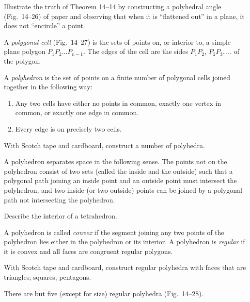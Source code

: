\documentclass[11pt]{book}
\theoremstyle{bkplain}
\theoremstyle{XIplainnote}
\theoremstyle{bkplain}
\theoremstyle{bkplain}
\begin{document}
Illustrate the truth of Theorem 14--14 by constructing a polyhedral angle
(Fig.~14--26) of paper and observing that when it is ``flattened out'' in a
plane, it does not ``encircle'' a point.

\FIGXIVTWENTYSIXTWENTYSEVEN

\begin{definition}
A \emph{polygonal cell} (Fig.~14--27) is the sets of points on, or interior to,
a simple plane polygon $P_1P_2\ldots P_{n-1}$. The edges of the cell are the
sides $P_1P_2$, $P_2P_3, \ldots$ of the polygon.
\end{definition}

A \emph{polyhedron} is the set of points on a finite number of polygonal cells
joined together in the following way:

\begin{enumerate}[label=(\arabic*), leftmargin=2.1em, itemsep=2pt, topsep=3pt]
\item Any two cells have either no points in common, exactly one vertex in
      common, or exactly one edge in common.
\item Every edge is on precisely two cells.
\end{enumerate}

With Scotch tape and cardboard, construct a number of polyhedra.

\begin{theorem}
A polyhedron separates space in the following sense. The points not on the
polyhedron consist of two sets (called the inside and the outside) such that a
polygonal path joining an inside point and an outside point must intersect the
polyhedron, and two inside (or two outside) points can be joined by a polygonal
path not intersecting the polyhedron.
\end{theorem}

Describe the interior of a tetrahedron.

\begin{definition}
A polyhedron is called \emph{convex} if the segment joining any two points of
the polyhedron lies either in the polyhedron or its interior. A polyhedron is
\emph{regular} if it is convex and all faces are congruent regular polygons.
\end{definition}

With Scotch tape and cardboard, construct regular polyhedra with faces that are
triangles; squares; pentagons.

\begin{theorem}
There are but five (except for size) regular polyhedra (Fig.~14--28).
\end{theorem}
\end{document}
